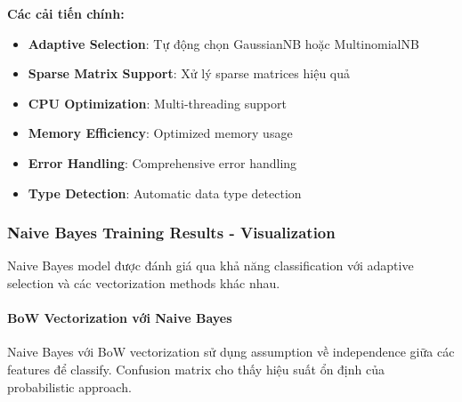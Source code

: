\textbf{Các cải tiến chính:}
\begin{itemize}
    \item \textbf{Adaptive Selection}: Tự động chọn GaussianNB hoặc MultinomialNB
    \item \textbf{Sparse Matrix Support}: Xử lý sparse matrices hiệu quả
    \item \textbf{CPU Optimization}: Multi-threading support
    \item \textbf{Memory Efficiency}: Optimized memory usage
    \item \textbf{Error Handling}: Comprehensive error handling
    \item \textbf{Type Detection}: Automatic data type detection
\end{itemize}

\subsubsection{Naive Bayes Training Results - Visualization}

Naive Bayes model được đánh giá qua khả năng classification với adaptive selection và các vectorization methods khác nhau.

\paragraph{BoW Vectorization với Naive Bayes}

Naive Bayes với BoW vectorization sử dụng assumption về independence giữa các features để classify. Confusion matrix cho thấy hiệu suất ổn định của probabilistic approach.

